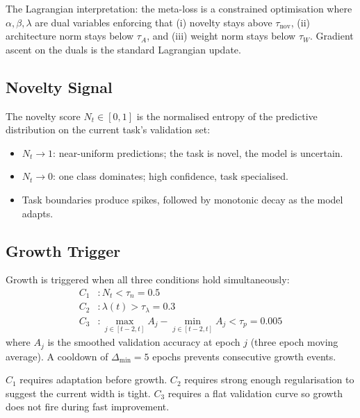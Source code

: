 \documentclass[conference]{IEEEtran}
\begin{document}
The Lagrangian interpretation: the meta-loss is a constrained optimisation where $\alpha, \beta, \lambda$ are dual variables enforcing that (i) novelty stays above $\tau_{\mathrm{nov}}$, (ii) architecture norm stays below $\tau_A$, and (iii) weight norm stays below $\tau_W$. Gradient ascent on the duals is the standard Lagrangian update.

\subsection{Novelty Signal}
The novelty score $N_t \in [0, 1]$ is the normalised entropy of the predictive distribution on the current task's validation set:
\begin{itemize}
    \item $N_t \to 1$: near-uniform predictions; the task is novel, the model is uncertain.
    \item $N_t \to 0$: one class dominates; high confidence, task specialised.
    \item Task boundaries produce spikes, followed by monotonic decay as the model adapts.
\end{itemize}

\subsection{Growth Trigger}
Growth is triggered when all three conditions hold simultaneously:
\begin{align}
    C_1 &: N_t < \tau_n = 0.5 \\
    C_2 &: \lambda(t) > \tau_{\lambda} = 0.3 \\
    C_3 &: \max_{j \in [t-2, t]} A_j - \min_{j \in [t-2, t]} A_j < \tau_p = 0.005
\end{align}
where $A_j$ is the smoothed validation accuracy at epoch $j$ (three epoch moving average). A cooldown of $\Delta_{\min} = 5$ epochs prevents consecutive growth events.

$C_1$ requires adaptation before growth. $C_2$ requires strong enough regularisation to suggest the current width is tight. $C_3$ requires a flat validation curve so growth does not fire during fast improvement.
\end{document}

